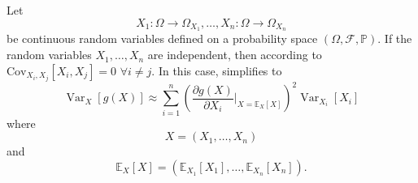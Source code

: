 \begin{remark}
	\label{remark:error_prop_independent}
	Let
	\begin{equation}
		X_1\colon\Omega \to \Omega_{X_1}, \dots, X_n\colon\Omega \to \Omega_{X_n}
	\end{equation}
	be continuous random variables defined on a probability space $(\Omega, \mathcal{F}, \mathbb{P})$.	If the random variables $X_1, \dots, X_n$ are independent, then according to  $\mathrm{Cov}_{X_i,X_j}[X_i, X_j] = 0$ $\forall i \neq j$. In this case,  simplifies to
	\begin{equation}
		\operatorname{Var}_{X}[g(X)] \approx \sum_{i=1}^n \left(\frac{\partial g(X)}{\partial X_i}\Big|_{X = \mathbb{E}_X[X]}\right)^2 \operatorname{Var}_{X_i}[X_i]
		\label{eq:error_prop}
	\end{equation}
	where 
	\begin{equation}
		X = (X_1, \dots, X_n)
	\end{equation}
	and
	\begin{equation}
		\mathbb{E}_X[X] = (\mathbb{E}_{X_1}[X_1], \dots, \mathbb{E}_{X_n}[X_n]).
	\end{equation}
\end{remark}


